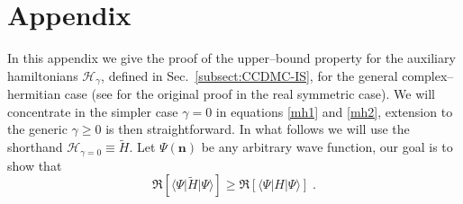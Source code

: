   
%
\section*{Appendix}
In this appendix we give the proof of the upper--bound property for the auxiliary hamiltonians $\mathcal{H}_{\gamma}$, defined in Sec.~\ref{subsect:CCDMC-IS}, for
the general complex--hermitian case (see \cite{TenHaaf95} for the original proof in the real symmetric case).
We will concentrate in the simpler case $\gamma=0$ in equations \eqref{mh1} and \eqref{mh2}, extension to the generic $\gamma \geq 0$ is then straightforward. In what follows
 we will use the shorthand $\mathcal{H}_{\gamma=0} \equiv \widetilde{H}$. Let $\Psi(\mathbf{n})$ be any arbitrary wave function, our goal is to show that 
\begin{equation}
\Re [\langle \Psi \lvert \widetilde{H}\rvert\Psi \rangle]\geq\Re\left[ \langle \Psi |H|\Psi \rangle\right]\;. 
\end{equation}

